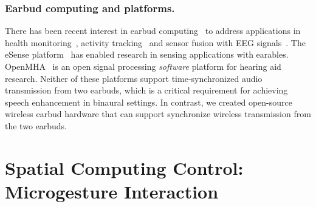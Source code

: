 \documentclass [11pt, proquest] {uwthesis}[2020/02/24]
\begin{document}
\subsubsection{Earbud  computing and platforms.}
There has been recent interest in earbud computing~\cite{oesense21,esense-1,esense-2,plat-1,romit-1} to address  applications in health monitoring~\cite{infection,tam1,tymp}, activity tracking~\cite{mobisys21} and sensor fusion with EEG signals~\cite{eeg2}. The  eSense platform~\cite{esense-1,esense-2} has enabled research in   sensing applications with earables. OpenMHA~\cite{open-1,open-2} is an open signal processing {\it software} platform for hearing aid research. Neither of these  platforms   support time-synchronized audio transmission from two earbuds, which is a critical requirement for achieving  speech enhancement in binaural settings. In contrast, we created open-source wireless earbud hardware that can support synchronize wireless transmission from the two earbuds. 

\section{Spatial Computing Control: Microgesture Interaction}
\end{document}
